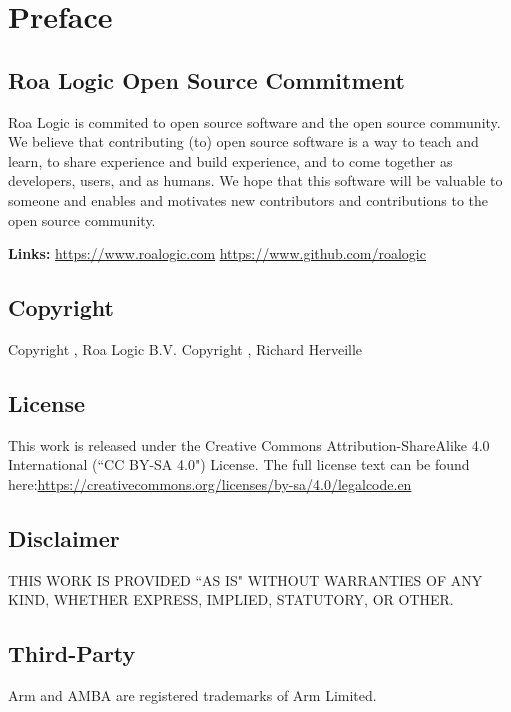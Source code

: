 \chapter{Preface}\label{preface}

\section{Roa Logic Open Source Commitment}
Roa Logic is commited to open source software and the open source community.
We believe that contributing (to) open source software is a way to teach and learn, to share experience and build experience, and to come together as developers, users, and as humans.
We hope that this software will be valuable to someone and enables and motivates new contributors and contributions to the open source community.

\noindent\textbf{Links:}\newline
\url{https://www.roalogic.com}\newline
\url{https://www.github.com/roalogic}


\section{Copyright}

Copyright , Roa Logic B.V.\newline
Copyright , Richard Herveille


\section{License}

This work is released under the Creative Commons Attribution-ShareAlike 4.0 International (``CC BY-SA 4.0") License.
The full license text can be found here:\newline \url{https://creativecommons.org/licenses/by-sa/4.0/legalcode.en}


\section{Disclaimer}

THIS WORK IS PROVIDED ``AS IS" WITHOUT WARRANTIES OF ANY KIND, WHETHER EXPRESS, IMPLIED, STATUTORY, OR OTHER.


\section{Third-Party}

Arm and AMBA are registered trademarks of Arm Limited.

